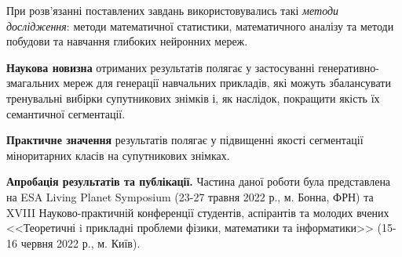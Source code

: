 При розв'язанні поставлених завдань використовувались такі \emph{методи дослідження}:
методи математичної статистики, математичного аналізу та методи
побудови та навчання глибоких нейронних мереж.

\textbf{Наукова новизна} отриманих результатів полягає у
застосуванні генеративно-змагальних мереж для генерації
навчальних прикладів, які можуть збалансувати тренувальні
вибірки супутникових знімків і, як наслідок, покращити
якість їх семантичної сегментації.

\textbf{Практичне значення} результатів полягає у підвищенні якості
сегментації міноритарних класів на супутникових знімках.

\textbf{Апробація результатів та публікації.}
Частина даної роботи була представлена на
ESA Living Planet Symposium (23-27 травня 2022 р., м. Бонна, ФРН)
та XVIII Науково-практичній конференції
студентів, аспірантів
та молодих вчених <<Теоретичні i прикладні проблеми фізики,
математики та інформатики>> (15-16 червня 2022 р., м. Київ).
